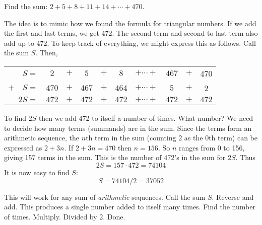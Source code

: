\documentclass[12pt]{article}
\begin{document}
\begin{example}
  Find the sum:  $2 + 5 + 8 + 11 + 14 + \cdots + 470$.
  
  \begin{solution}
    The idea is to mimic how we found the formula for triangular numbers.  If we add the first and last terms, we get 472.  The second term and second-to-last term also add up to 472.  To keep track of everything, we might express this as follows.  Call the sum $S$.  Then,
    
    \begin{center}
    \begin{tabular}{rccccccccc}
      $S  =  $& $2 $&$ + $& $5$ & $ + $ & $8$ & $+ \cdots + $ & $467$ &$ + $ & 470 \\
     $+ \quad S  = $& $470$ & $+ $ & $467$ & $ + $ & $464$& $+ \cdots + $&$ 5$ & $+$ & 2 \\ \hline
     $2S  = $& $472$ & $+ $ & $472$ & $ + $ & $472$& $+ \cdots + $&$472$ & $+$ & $472$ \\
    \end{tabular}
    \end{center}
    
    To find $2S$ then we add 472 to itself a number of times.  What number?  We need to decide how many terms (summands) are in the sum.  Since the terms form an arithmetic sequence, the $n$th term in the sum (counting $2$ as the 0th term) can be expressed as $2 + 3n$.  If $2 + 3n = 470$  then $n = 156$.  So $n$ ranges from 0 to 156, giving 157 terms in the sum.  This is the number of 472's in the sum for $2S$.  Thus
    \[2S = 157\cdot 472 = 74104\]
    It is now easy to find $S$:
    \[S = 74104/2 = 37052\]
  \end{solution}
\end{example}

This will work for any sum of {\em arithmetic} sequences.  Call the sum $S$.  Reverse and add.  This produces a single number added to itself many times.  Find the number of times.  Multiply.  Divided by 2.  Done.
\end{document}
